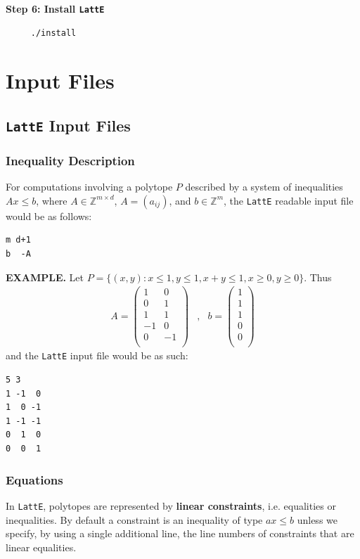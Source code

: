 \documentclass{article}
\newcommand{\Z}{{\mathbb Z}}
\begin{document}
\textbf{Step 6: Install {\tt LattE}} 

\begin{verbatim}
     ./install
\end{verbatim}



\newpage

\section{Input Files}\label{Input Files}

\subsection{{\tt LattE} Input Files}

\subsubsection{Inequality Description}
For computations involving a polytope $P$ described by a
system of inequalities $Ax\leq b$, where $A\in\Z^{m\times d}$, 
$A=(a_{ij})$, and $b\in\Z^m$, the {\tt LattE} readable input file
would be as follows: 
\begin{verbatim}
m d+1
b  -A
\end{verbatim}

\textbf{EXAMPLE.}
Let $P=\{(x,y): x\leq 1, y\leq 1, x+y\leq 1, x\geq 0, y\geq 0\}$.
Thus
\[
\begin{array}{ccc}
A=\left(
\begin{array}{rr} 
 1 &  0 \\ 
 0 &  1 \\ 
 1 &  1 \\
-1 &  0 \\ 
 0 & -1 \\ 
\end{array} 
\right) 
& , &
b = \left( 
\begin{array}{r} 
1 \\ 
1 \\ 
1 \\ 
0 \\
0 \\ 
\end{array} 
\right)
\end{array}
\]
and the {\tt LattE} input file would be as such:
\begin{verbatim}
5 3
1 -1  0
1  0 -1
1 -1 -1
0  1  0
0  0  1
\end{verbatim}

\subsubsection{Equations}
In {\tt LattE}, polytopes are represented by {\bf linear constraints},
i.e. equalities or inequalities. By default a constraint is an
inequality of type $ax\leq b$ unless we specify, by using a single
additional line, the line numbers of constraints that are linear
equalities. 
\end{document}
